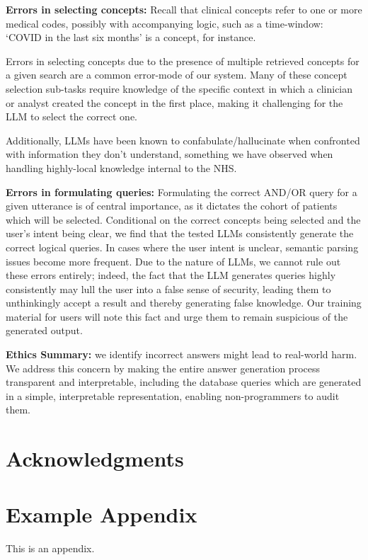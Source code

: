 \documentclass[11pt]{article}
\begin{document}
\textbf{Errors in selecting concepts:}
Recall that clinical concepts refer to one or more medical codes, possibly with accompanying logic, such as a time-window: `COVID in the last six months' is a concept, for instance.

Errors in selecting concepts due to the presence of multiple retrieved concepts for a given search are a common error-mode of our system. Many of these concept selection sub-tasks require knowledge of the specific context in which a clinician or analyst created the concept in the first place, making it challenging for the LLM to select the correct one.

Additionally, LLMs have been known to confabulate/hallucinate when confronted with information they don't understand, something we have observed when handling highly-local knowledge internal to the NHS.

\textbf{Errors in formulating queries:}
Formulating the correct AND/OR query for a given utterance is of central importance, as it dictates the cohort of patients which will be selected.
Conditional on the correct concepts being selected and the user's intent being clear, we find that the tested LLMs consistently generate the correct logical queries.
In cases where the user intent is unclear, semantic parsing issues become more frequent. Due to the nature of LLMs, we cannot rule out these errors entirely; indeed, the fact that the LLM generates queries highly consistently may lull the user into a false sense of security, leading them to unthinkingly accept a result and thereby generating false knowledge. Our training material for users will note this fact and urge them to remain suspicious of the generated output.

\textbf{Ethics Summary:} we identify incorrect answers might lead to real-world harm. We address this concern by making the entire answer generation process transparent and interpretable, including the database queries which are generated in a simple, interpretable representation, enabling non-programmers to audit them.


\section*{Acknowledgments}



\appendix

\section{Example Appendix}
\label{sec:appendix}

This is an appendix.
\end{document}
